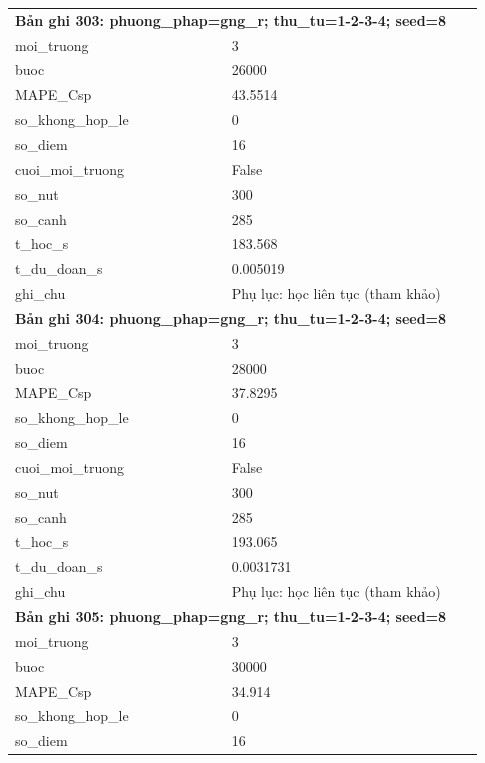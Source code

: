 \begin{longtable}{p{0.43\linewidth}p{0.50\linewidth}}
\midrule
\multicolumn{2}{p{0.95\linewidth}}{\textbf{Bản ghi 303: phuong\_phap=gng\_r; thu\_tu=1-2-3-4; seed=8}} \\
moi\_\allowbreak truong & 3 \\
buoc & 26000 \\
MAPE\_\allowbreak Csp & 43.5514 \\
so\_\allowbreak khong\_\allowbreak hop\_\allowbreak le & 0 \\
so\_\allowbreak diem & 16 \\
cuoi\_\allowbreak moi\_\allowbreak truong & False \\
so\_\allowbreak nut & 300 \\
so\_\allowbreak canh & 285 \\
t\_\allowbreak hoc\_\allowbreak s & 183.568 \\
t\_\allowbreak du\_\allowbreak doan\_\allowbreak s & 0.005019 \\
ghi\_\allowbreak chu & Phụ lục: học liên tục (tham khảo) \\
\midrule
\multicolumn{2}{p{0.95\linewidth}}{\textbf{Bản ghi 304: phuong\_phap=gng\_r; thu\_tu=1-2-3-4; seed=8}} \\
moi\_\allowbreak truong & 3 \\
buoc & 28000 \\
MAPE\_\allowbreak Csp & 37.8295 \\
so\_\allowbreak khong\_\allowbreak hop\_\allowbreak le & 0 \\
so\_\allowbreak diem & 16 \\
cuoi\_\allowbreak moi\_\allowbreak truong & False \\
so\_\allowbreak nut & 300 \\
so\_\allowbreak canh & 285 \\
t\_\allowbreak hoc\_\allowbreak s & 193.065 \\
t\_\allowbreak du\_\allowbreak doan\_\allowbreak s & 0.0031731 \\
ghi\_\allowbreak chu & Phụ lục: học liên tục (tham khảo) \\
\midrule
\multicolumn{2}{p{0.95\linewidth}}{\textbf{Bản ghi 305: phuong\_phap=gng\_r; thu\_tu=1-2-3-4; seed=8}} \\
moi\_\allowbreak truong & 3 \\
buoc & 30000 \\
MAPE\_\allowbreak Csp & 34.914 \\
so\_\allowbreak khong\_\allowbreak hop\_\allowbreak le & 0 \\
so\_\allowbreak diem & 16 \\

\end{longtable}
